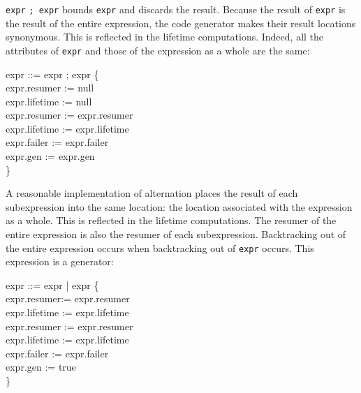 \texttt{expr} \texttt{; expr} bounds
\texttt{expr} and discards the result. Because the
result of \texttt{expr} is the result of the entire
expression, the code generator makes their result locations
synonymous. This is reflected in the lifetime computations. Indeed,
all the attributes of \texttt{expr} and those of the
expression as a whole are the same:

\goodbreak
\begin{iconcode}
\>expr ::= expr ; expr \{\\
\>\>\>\>\>expr.resumer := null\\
\>\>\>\>\>expr.lifetime := null\\
\>\>\>\>\>expr.resumer := expr.resumer\\
\>\>\>\>\>expr.lifetime := expr.lifetime\\
\>\>\>\>\>expr.failer := expr.failer\\
\>\>\>\>\>expr.gen := expr.gen\\
\>\>\>\>\>\}\\
\end{iconcode}


A reasonable implementation of alternation places the result of each
subexpression into the same location: the location associated with the
expression as a whole. This is reflected in the lifetime
computations. The resumer of the entire expression is also the resumer
of each subexpression. Backtracking out of the entire expression
occurs when backtracking out of \texttt{expr}
occurs. This expression is a generator:

\goodbreak
\begin{iconcode}
\>expr ::= expr | expr \{\\
\>\>\>\>\>expr.resumer:= expr.resumer\\
\>\>\>\>\>expr.lifetime := expr.lifetime\\
\>\>\>\>\>expr.resumer := expr.resumer\\
\>\>\>\>\>expr.lifetime := expr.lifetime\\
\>\>\>\>\>expr.failer := expr.failer\\
\>\>\>\>\>expr.gen := true\\
\>\>\>\>\>\}\\
\end{iconcode}


